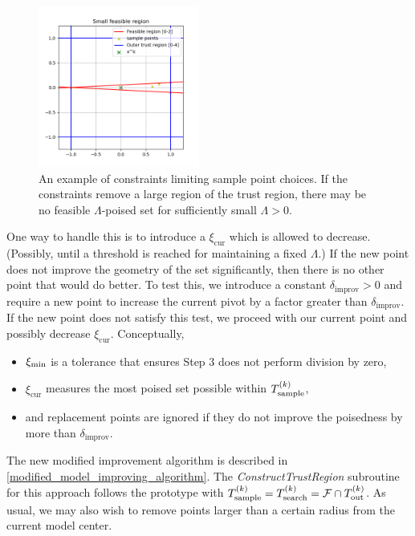\begin{figure}[ht]
    \centering
    \includegraphics[width=200px]{images/small_sample_region.png}
    \caption[An example of constraints limiting sample point choices.]
    	{An example of constraints limiting sample point choices.
    	If the constraints remove a large region of the trust region,
    	there may be no feasible $\Lambda$-poised set for sufficiently small $\Lambda>0$.
    }
    \label{lspc}
\end{figure}


One way to handle this is to introduce a $\xi_{\text{cur}}$ which is allowed to decrease.
(Possibly, until a threshold is reached for maintaining a fixed $\Lambda$.)
If the new point does not improve the geometry of the set significantly, then there is no other point that would do better.
To test this, we introduce a constant $\delta_{\text{improv}}>0$ and require a new point to increase the current pivot by a factor greater than $\delta_{\text{improv}}$.
If the new point does not satisfy this test, we proceed with our current point and possibly decrease $\xi_{\text{cur}}$.
Conceptually, 
\begin{itemize}
\item $\xi_{\text{min}}$ is a tolerance that ensures Step 3 does not perform division by zero,
\item $\xi_{\text{cur}}$ measures the most poised set possible within ${T_{\text{sample}}^{(k)}}$,
\item and replacement points are ignored if they do not improve the poisedness by more than $\delta_{\text{improv}}$.
\end{itemize}
The new modified improvement algorithm is described in \cref{modified_model_improving_algorithm}.
The \emph{ConstructTrustRegion} subroutine for this approach follows the prototype with ${T_{\text{sample}}^{(k)}} = {T_{\text{search}}^{(k)}} = {\mathcal F} \cap {T_{\text{out}}^{(k)}} $.
As usual, we may also wish to remove points larger than a certain radius from the current model center.

